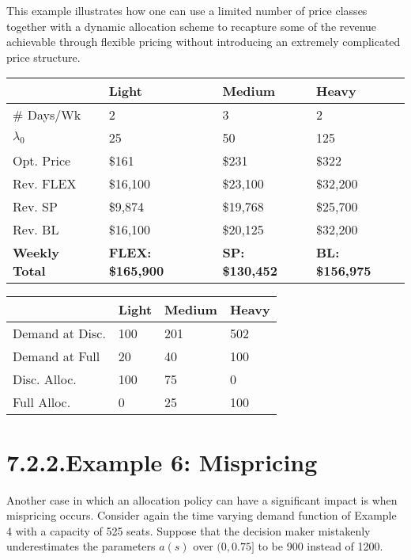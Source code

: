 This example illustrates how one can use a limited number of price classes together with a dynamic allocation scheme to recapture some of the revenue achievable through flexible pricing without introducing an extremely complicated price structure.

\begin{longtable}{|l|l|l|l|}
\hline
& \textbf{Light} & \textbf{Medium} & \textbf{Heavy} \\
\hline
\# Days/Wk & 2 & 3 & 2 \\
\hline
\(\lambda_0\) & 25 & 50 & 125 \\
\hline
Opt. Price & \$161 & \$231 & \$322 \\
\hline
Rev. FLEX & \$16,100 & \$23,100 & \$32,200 \\
\hline
Rev. SP & \$9,874 & \$19,768 & \$25,700 \\
\hline
Rev. BL & \$16,100 & \$20,125 & \$32,200 \\
\hline
\textbf{Weekly Total} & \textbf{FLEX: \$165,900} & \textbf{SP: \$130,452} & \textbf{BL: \$156,975} \\
\hline
\end{longtable}

\begin{longtable}{|l|l|l|l|}
\hline
& \textbf{Light} & \textbf{Medium} & \textbf{Heavy} \\
\hline
Demand at Disc. & 100 & 201 & 502 \\
\hline
Demand at Full & 20 & 40 & 100 \\
\hline
Disc. Alloc. & 100 & 75 & 0 \\
\hline
Full Alloc. & 0 & 25 & 100 \\
\hline
\end{longtable}

\section{7.2.2.Example 6: Mispricing}\label{mispricing}

Another case in which an allocation policy can have a significant impact is when mispricing occurs. Consider again the time varying demand function of Example 4 with a capacity of 525 seats. Suppose that the decision maker mistakenly underestimates the parameters \(a(s)\) over \((0, 0.75]\) to be 900 instead of 1200.

